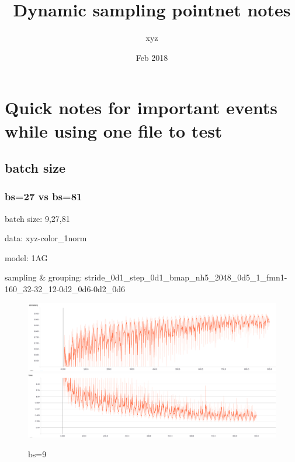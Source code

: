 \documentclass{article}
\title{Dynamic sampling pointnet notes}
\author{xyz}
\date{Feb 2018}
\begin{document}
\begin{titlepage}
\maketitle
\end{titlepage}	

\tableofcontents{}

\section{Quick notes for important events while using one file to test}
\subsection{batch size}
\subsubsection{bs=27 vs bs=81}
batch size: 9,27,81 \par
data: xyz-color\_1norm\par
model: 1AG\par
sampling \& grouping: stride\_0d1\_step\_0d1\_bmap\_nh5\_2048\_0d5\_1\_fmn1-160\_32-32\_12-0d2\_0d6-0d2\_0d6\par
\begin{figure}[h!]
	\caption{bs=9}
	\centering
	\includegraphics[width=\textwidth]{acc_log-model_1AG-gsbb_2C1-bs9-xyz-color_1norm-2048-mat}
	\includegraphics[width=\textwidth]{loss_log-model_1AG-gsbb_2C1-bs9-xyz-color_1norm-2048-mat}
\end{figure}
\end{document}
